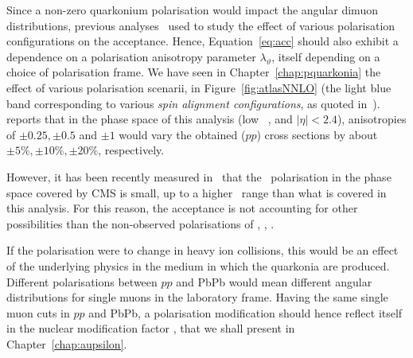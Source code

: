 Since a non-zero quarkonium polarisation would impact the angular
dimuon distributions, previous analyses~\cite{atlasUpsilon7tev,cmsUpsi1} used to study the effect of
various polarisation configurations on the acceptance. Hence,
Equation~\ref{eq:acc} should also exhibit a dependence on a
polarisation anisotropy parameter $\lambda_{\vartheta}$, itself depending on a choice of
polarisation frame.  We have seen in Chapter~\ref{chap:pquarkonia} the effect of
various polarisation scenarii, in Figure~\ref{fig:atlasNNLO} (the
light blue band corresponding to various \textit{spin alignment
  configurations}, as quoted
in~\cite{atlasUpsilon7tev}).~\cite{cmsUpsi1} reports that in the
phase space of this analysis (low \PgU\ \pt, and $\vert\eta\vert <
2.4$), 
anisotropies of $\pm 0.25, \pm 0.5$ and
$\pm 1$ would vary the obtained ($pp$) cross sections by about  $\pm
5\%, \pm 10\%, \pm 20\%$, respectively.



However, it has been recently measured in~\cite{CMSupsipol} that the
\PgU\ polarisation in the phase space covered by CMS is small, up to a
higher \pt\ range than what is covered in this analysis. For this
reason, the acceptance is not accounting for other possibilities than
the non-observed polarisations of \PgUa, \PgUb, \PgUc.


If the polarisation were to change in heavy ion collisions, this would
be an effect of the underlying physics in the medium in which the
quarkonia are produced. Different polarisations between $pp$ and PbPb
would mean different angular distributions for single muons in the laboratory
frame. Having the same single muon cuts in $pp$ and PbPb, a
polarisation modification should hence reflect itself in the nuclear
modification factor \RAA, that we shall present in
Chapter~\ref{chap:aupsilon}. 



